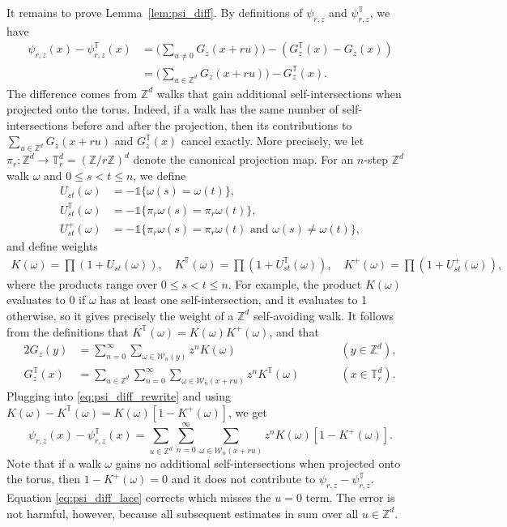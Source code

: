 \documentclass[11pt,hidelinks]{article}
\theoremstyle{plain}
\numberwithin{equation}{section}
\newcommand{\Z}{\mathbb{Z}}
\newcommand{\T}{\mathbb{T}}
\newcommand{\Wcal}{\mathcal{W}}
\renewcommand{\(}{\left(}
\renewcommand{\)}{\right)}
\newcommand{\1}{\mathds{1}}
\newcommand{\nl}{\nonumber \\}
\newcommand{\supT}{^{ \mathbb{T} }}
\newcommand{\subrz}{_{r,z}}
\newcommand{\st}{{st}}
\begin{document}
It remains to prove Lemma~\ref{lem:psi_diff}. 
By definitions of $\psi\subrz$ and $\psi\subrz\supT$, we have
\begin{align} \label{eq:psi_diff_rewrite}
\psi\subrz(x) - \psi\subrz\supT(x) 
&= \bigg( \sum_{u\ne0} G_z(x+ru) \bigg) - \( G_z\supT(x) - G_z(x) \)	 \nl
&= \bigg( \sum_{u\in \Z^d} G_z(x+ru) \bigg) -  G_z\supT(x). 
\end{align}
The difference comes from $\Z^d$ walks that gain additional self-intersections when projected onto the torus. Indeed, if a walk has the same number of self-intersections before and after the projection, then its contributions to $\sum_{u\in \Z^d} G_z(x+ru)$ and $G_z\supT(x)$ cancel exactly. 
More precisely, we let $\pi_r: \Z^d \to \T^d_r = (\Z/r\Z)^d$ denote the canonical projection map. 
For an $n$-step $\Z^d$ walk $\omega$ and $0\le s< t\le n$, we define
\begin{align}
U_\st (\omega) &= - \1 \{ \omega(s) = \omega(t) \},	\\
U_\st\supT (\omega) &= - \1 \{ \pi_r\omega(s) = \pi_r\omega(t) \},	\\
U_\st^+ (\omega) &= - \1 \{ \pi_r\omega(s) = \pi_r\omega(t) \text{ and }\omega(s) \ne \omega(t) \}	,
\end{align}
and define weights
\begin{align}
K(\omega) = \prod (1 +  U_\st(\omega)), \quad
K\supT(\omega) = \prod (1 +  U_\st\supT(\omega)), \quad
K^+(\omega) = \prod (1 +  U_\st^+(\omega)), 
\end{align}
where the products range over $0 \le s < t \le n$. 
For example, the product $K(\omega)$ evaluates to 0 if $\omega$ has at least one self-intersection, and it evaluates to 1 otherwise, so it gives precisely the weight of a $\Z^d$ self-avoiding walk. 
It follows from the definitions that $K\supT(\omega) = K(\omega) K^+(\omega)$, and that
\begin{alignat}{2}
G_z (y) &= \sum_{n=0}^\infty \sum_{\omega \in \Wcal_n(y) } z^nK(\omega)
	\qquad &&(y\in \Z^d), 	\\
G_z \supT (x) &= \sum_{u\in \Z^d} \sum_{n=0}^\infty \sum_{\omega \in \Wcal_n(x+ru) } z^n K\supT(\omega)
	\qquad &&(x\in \T^d_r). 
\end{alignat}
Plugging into \eqref{eq:psi_diff_rewrite}
and using $K(\omega) - K\supT(\omega) = K(\omega) [ 1 - K^+(\omega) ]$, we get
\begin{equation} \label{eq:psi_diff_lace}
\psi\subrz(x) - \psi\subrz\supT(x) 
= \sum_{u\in \Z^d} \sum_{n=0}^\infty \sum_{\omega \in \Wcal_n(x+ru) } z^n K(\omega) [ 1 - K^+(\omega) ]  .
\end{equation}
Note that if a walk $\omega$ gains no additional self-intersections when projected onto the torus, then $ 1 - K^+(\omega)=0$ and it does not contribute to $\psi\subrz - \psi\subrz\supT$. 
Equation \eqref{eq:psi_diff_lace} corrects \cite[(6.33)]{Slad23_wsaw} which misses the $u=0$ term. The error is not harmful, however, because all subsequent estimates in \cite{Slad23_wsaw} sum over all $u\in \Z^d$. 
\end{document}
